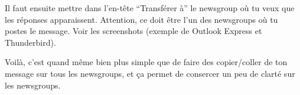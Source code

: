 Il faut ensuite mettre dans l'en-t\^ete ``Transf\'erer \`a'' le newsgroup o\`u tu veux
que les r\'eponses apparaissent.
Attention, ce doit \^etre l'un des newsgroups o\`u tu postes le message.
Voir les screenshots (exemple de Outlook Express et Thunderbird).\\


Voil\`a, c'est quand m\^eme bien plus simple que de faire des copier/coller
de ton message sur tous les newsgroups,
et \c{c}a permet de consercer un peu de clart\'e sur les newsgroups.

